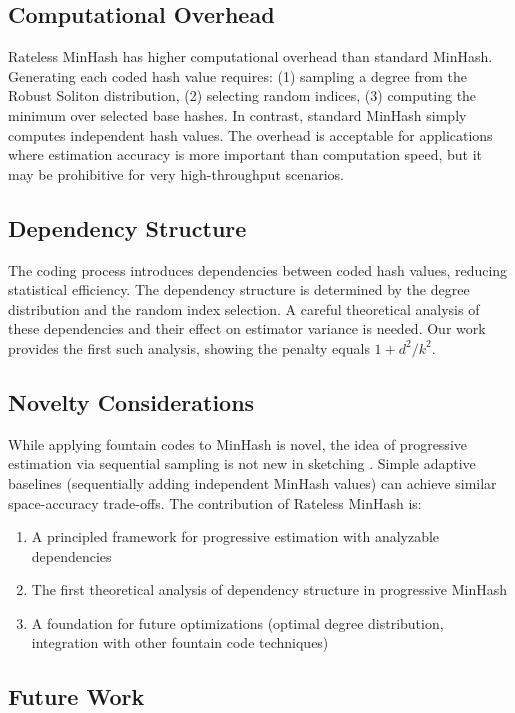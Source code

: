 \documentclass[11pt,letterpaper]{article}
\begin{document}
\subsection{Computational Overhead}

Rateless MinHash has higher computational overhead than standard MinHash. Generating each coded hash value requires: (1) sampling a degree from the Robust Soliton distribution, (2) selecting random indices, (3) computing the minimum over selected base hashes. In contrast, standard MinHash simply computes independent hash values. The overhead is acceptable for applications where estimation accuracy is more important than computation speed, but it may be prohibitive for very high-throughput scenarios.

\subsection{Dependency Structure}

The coding process introduces dependencies between coded hash values, reducing statistical efficiency. The dependency structure is determined by the degree distribution and the random index selection. A careful theoretical analysis of these dependencies and their effect on estimator variance is needed. Our work provides the first such analysis, showing the penalty equals $1 + d^2/k^2$.

\subsection{Novelty Considerations}

While applying fountain codes to MinHash is novel, the idea of progressive estimation via sequential sampling is not new in sketching \cite{Cormode2012}. Simple adaptive baselines (sequentially adding independent MinHash values) can achieve similar space-accuracy trade-offs. The contribution of Rateless MinHash is:
\begin{enumerate}
    \item A principled framework for progressive estimation with analyzable dependencies
    \item The first theoretical analysis of dependency structure in progressive MinHash
    \item A foundation for future optimizations (optimal degree distribution, integration with other fountain code techniques)
\end{enumerate}

\subsection{Future Work}
\end{document}
